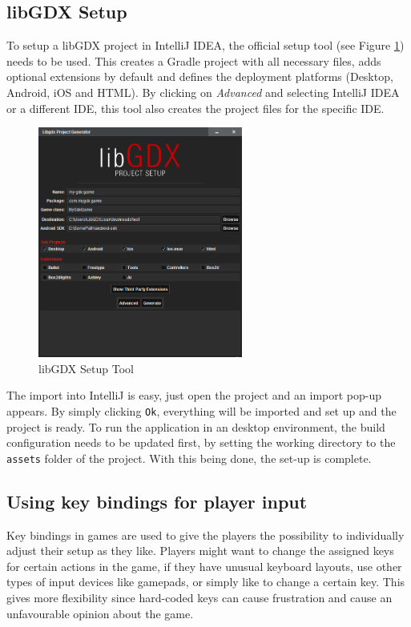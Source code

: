 \documentclass[12p]{article}
\begin{document}
\subsection{libGDX Setup}

To setup a libGDX project in IntelliJ IDEA, the official setup tool (see Figure \ref{fig:LibGDXSetupScreenshot}) needs to be used. This creates a Gradle project with all necessary files, adds optional extensions by default and defines the deployment platforms (Desktop, Android, iOS and HTML). By clicking on \emph{Advanced} and selecting IntelliJ IDEA or a different IDE, this tool also creates the project files for the specific IDE.

\begin{figure}[h]
    \centering
    \includegraphics[width=0.6\textwidth]{libGDX_setup.png}
    \caption{libGDX Setup Tool}
    \label{fig:LibGDXSetupScreenshot}
\end{figure}

The import into IntelliJ is easy, just open the project and an import pop-up appears. By simply clicking \texttt{Ok}, everything will be imported and set up and the project is ready. To run the application in an desktop environment, the build configuration needs to be updated first, by setting the working directory to the \texttt{assets} folder of the project. With this being done, the set-up is complete.

\subsection{Using key bindings for player input}

Key bindings in games are used to give the players the possibility to individually adjust their setup as they like. Players might want to change the assigned keys for certain actions in the game, if they have unusual keyboard layouts, use other types of input devices like gamepads, or simply like to change a certain key. This gives more flexibility since hard-coded keys can cause frustration and cause an unfavourable opinion about the game.
\end{document}
